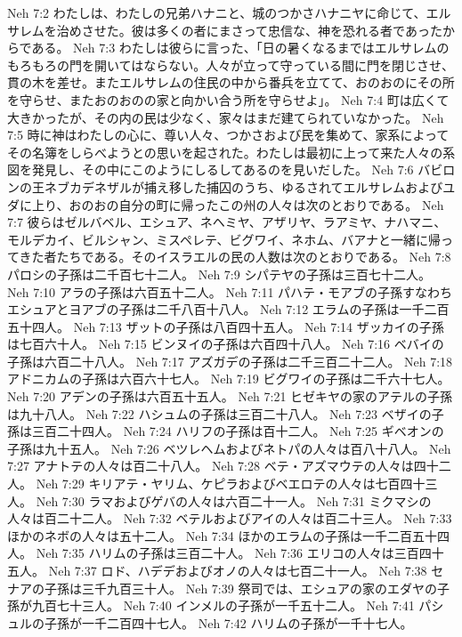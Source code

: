 Neh 7:2  わたしは、わたしの兄弟ハナニと、城のつかさハナニヤに命じて、エルサレムを治めさせた。彼は多くの者にまさって忠信な、神を恐れる者であったからである。
Neh 7:3  わたしは彼らに言った、「日の暑くなるまではエルサレムのもろもろの門を開いてはならない。人々が立って守っている間に門を閉じさせ、貫の木を差せ。またエルサレムの住民の中から番兵を立てて、おのおのにその所を守らせ、またおのおのの家と向かい合う所を守らせよ」。
Neh 7:4  町は広くて大きかったが、その内の民は少なく、家々はまだ建てられていなかった。
Neh 7:5  時に神はわたしの心に、尊い人々、つかさおよび民を集めて、家系によってその名簿をしらべようとの思いを起された。わたしは最初に上って来た人々の系図を発見し、その中にこのようにしるしてあるのを見いだした。
Neh 7:6  バビロンの王ネブカデネザルが捕え移した捕囚のうち、ゆるされてエルサレムおよびユダに上り、おのおの自分の町に帰ったこの州の人々は次のとおりである。
Neh 7:7  彼らはゼルバベル、エシュア、ネヘミヤ、アザリヤ、ラアミヤ、ナハマニ、モルデカイ、ビルシャン、ミスペレテ、ビグワイ、ネホム、バアナと一緒に帰ってきた者たちである。そのイスラエルの民の人数は次のとおりである。
Neh 7:8  パロシの子孫は二千百七十二人。
Neh 7:9  シパテヤの子孫は三百七十二人。
Neh 7:10  アラの子孫は六百五十二人。
Neh 7:11  パハテ・モアブの子孫すなわちエシュアとヨアブの子孫は二千八百十八人。
Neh 7:12  エラムの子孫は一千二百五十四人。
Neh 7:13  ザットの子孫は八百四十五人。
Neh 7:14  ザッカイの子孫は七百六十人。
Neh 7:15  ビンヌイの子孫は六百四十八人。
Neh 7:16  ベバイの子孫は六百二十八人。
Neh 7:17  アズガデの子孫は二千三百二十二人。
Neh 7:18  アドニカムの子孫は六百六十七人。
Neh 7:19  ビグワイの子孫は二千六十七人。
Neh 7:20  アデンの子孫は六百五十五人。
Neh 7:21  ヒゼキヤの家のアテルの子孫は九十八人。
Neh 7:22  ハシュムの子孫は三百二十八人。
Neh 7:23  ベザイの子孫は三百二十四人。
Neh 7:24  ハリフの子孫は百十二人。
Neh 7:25  ギベオンの子孫は九十五人。
Neh 7:26  ベツレヘムおよびネトパの人々は百八十八人。
Neh 7:27  アナトテの人々は百二十八人。
Neh 7:28  ベテ・アズマウテの人々は四十二人。
Neh 7:29  キリアテ・ヤリム、ケピラおよびベエロテの人々は七百四十三人。
Neh 7:30  ラマおよびゲバの人々は六百二十一人。
Neh 7:31  ミクマシの人々は百二十二人。
Neh 7:32  ベテルおよびアイの人々は百二十三人。
Neh 7:33  ほかのネボの人々は五十二人。
Neh 7:34  ほかのエラムの子孫は一千二百五十四人。
Neh 7:35  ハリムの子孫は三百二十人。
Neh 7:36  エリコの人々は三百四十五人。
Neh 7:37  ロド、ハデデおよびオノの人々は七百二十一人。
Neh 7:38  セナアの子孫は三千九百三十人。
Neh 7:39  祭司では、エシュアの家のエダヤの子孫が九百七十三人。
Neh 7:40  インメルの子孫が一千五十二人。
Neh 7:41  パシュルの子孫が一千二百四十七人。
Neh 7:42  ハリムの子孫が一千十七人。
